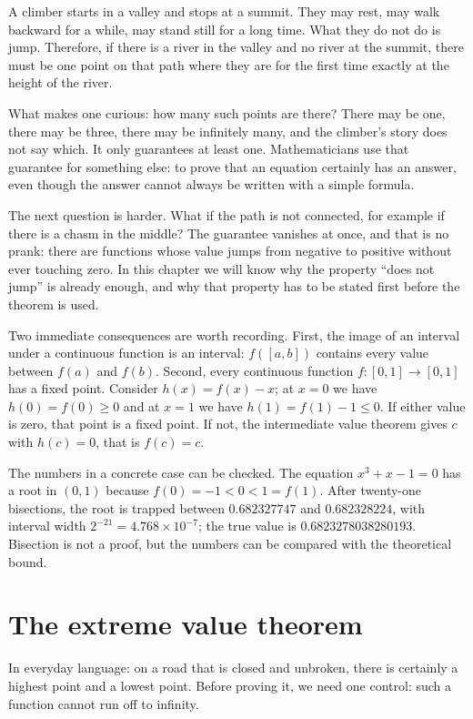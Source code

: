 \begin{untukanak}
A climber starts in a valley and stops at a summit. They may rest, may walk backward for
a while, may stand still for a long time. What they do not do is jump. Therefore, if
there is a river in the valley and no river at the summit, there must be one point on
that path where they are for the first time exactly at the height of the river.

What makes one curious: how many such points are there? There may be one, there may be
three, there may be infinitely many, and the climber's story does not say which. It only
guarantees at least one. Mathematicians use that guarantee for something else: to prove
that an equation certainly has an answer, even though the answer cannot always be written
with a simple formula.

The next question is harder. What if the path is not connected, for example if there is a
chasm in the middle? The guarantee vanishes at once, and that is no prank: there are
functions whose value jumps from negative to positive without ever touching zero.
In this chapter we will know why the property ``does not jump'' is already enough, and
why that property has to be stated first before the theorem is used.
\end{untukanak}

Two immediate consequences are worth recording. First, the image of an interval under a
continuous function is an interval: $f([a,b])$ contains every value between $f(a)$ and
$f(b)$. Second, every continuous function $f\colon[0,1]\to[0,1]$ has a fixed point.
Consider $h(x)=f(x)-x$; at $x=0$ we have $h(0)=f(0)\ge 0$ and at $x=1$ we have
$h(1)=f(1)-1\le 0$. If either value is zero, that point is a fixed point. If not, the
intermediate value theorem gives $c$ with $h(c)=0$, that is $f(c)=c$.

The numbers in a concrete case can be checked. The equation $x^{3}+x-1=0$ has a root in
$(0,1)$ because $f(0)=-1<0<1=f(1)$. After twenty-one bisections, the root is trapped
between $0.682327747$ and $0.682328224$, with interval width $2^{-21}=4.768\times10^{-7}$;
the true value is $0.6823278038280193$. Bisection is not a proof, but the numbers can be
compared with the theoretical bound.

\section{The extreme value theorem}

In everyday language: on a road that is closed and unbroken, there is certainly a highest
point and a lowest point. Before proving it, we need one control: such a function cannot
run off to infinity.

